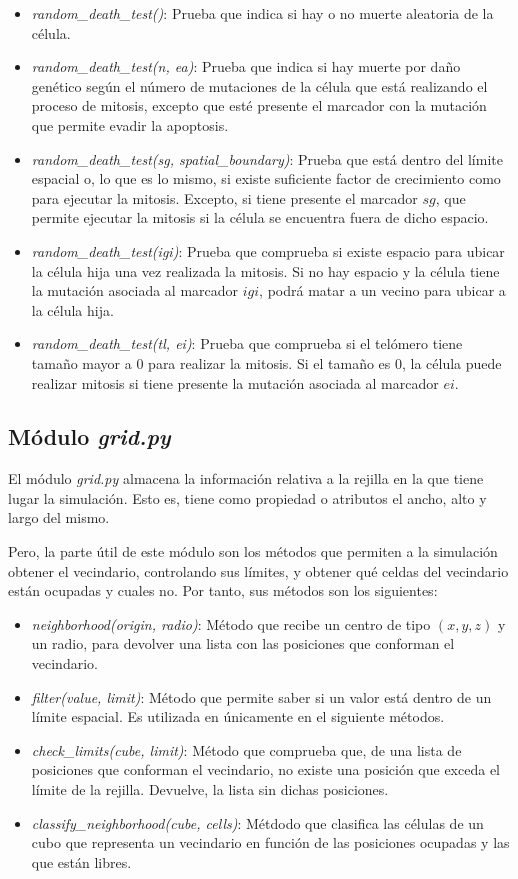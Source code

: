 \begin{itemize}
  \item \textit{random\_death\_test()}: Prueba que indica si hay o no muerte aleatoria de la célula.
  \item \textit{random\_death\_test(n, ea)}: Prueba que indica si hay muerte por daño genético según
  el número de mutaciones de la célula que está realizando el proceso de mitosis, excepto que esté
  presente el marcador con la mutación que permite evadir la apoptosis.
  \item \textit{random\_death\_test(sg, spatial\_boundary)}: Prueba que está dentro del
  límite espacial o, lo que es lo mismo, si existe suficiente factor de crecimiento como
  para ejecutar la mitosis. Excepto, si tiene presente el marcador $sg$, que permite
  ejecutar la mitosis si la célula se encuentra fuera de dicho espacio.
  \item \textit{random\_death\_test(igi)}: Prueba que comprueba si existe espacio para ubicar la célula
  hija una vez realizada la mitosis. Si no hay espacio y la célula tiene la mutación asociada al
  marcador $igi$, podrá matar a un vecino para ubicar a la célula hija.
  \item \textit{random\_death\_test(tl, ei)}: Prueba que comprueba si el telómero tiene tamaño
  mayor a $0$ para realizar la mitosis. Si el tamaño es $0$, la célula puede realizar mitosis
  si tiene presente la mutación asociada al marcador $ei$.
\end{itemize}

\subsection{Módulo \textit{grid.py}}

El módulo \textit{grid.py} almacena la información relativa a la rejilla en la que tiene lugar
la simulación. Esto es, tiene como propiedad o atributos el ancho, alto y largo del mismo.

Pero, la parte útil de este módulo son los métodos que permiten a la simulación obtener el vecindario,
controlando sus límites, y obtener qué celdas del vecindario están ocupadas y cuales no. Por tanto,
sus métodos son los siguientes:

\begin{itemize}
  \item \textit{neighborhood(origin, radio)}: Método que recibe un centro de tipo $(x,y,z)$ y un radio, para devolver una lista con las posiciones
  que conforman el vecindario.
  \item \textit{filter(value, limit)}: Método que permite saber si un valor está dentro de un límite espacial. Es utilizada en únicamente en el siguiente métodos.
  \item \textit{check\_limits(cube, limit)}: Método que comprueba que, de una lista de posiciones que conforman el vecindario, no existe una posición que exceda el
  límite de la rejilla. Devuelve, la lista sin dichas posiciones.
  \item \textit{classify\_neighborhood(cube, cells)}: Métdodo que clasifica las células de un cubo que representa un vecindario en función de las posiciones
  ocupadas y las que están libres.
\end{itemize}

